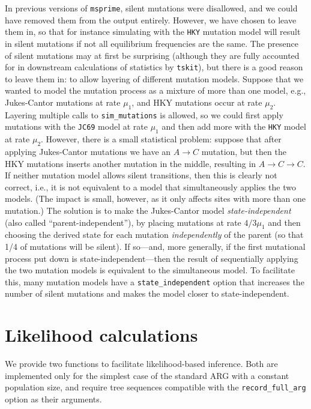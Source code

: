 \documentclass{article}
\newcommand{\msprime}[0]{\texttt{msprime}}
\newcommand{\tskit}[0]{\texttt{tskit}}
\begin{document}
In previous versions of \msprime, silent mutations were disallowed,
and we could have removed them from the output entirely.
However, we have chosen to leave them in, so that for instance
simulating with the \texttt{HKY} mutation model will result in silent mutations
if not all equilibrium frequencies are the same.
The presence of silent mutations may at first be surprising
(although they are fully accounted for in downstream calculations of statistics
by \tskit),
but there is a good reason to leave them in:
to allow layering of different mutation models.
Suppose that we wanted to model the mutation process as a mixture of more than one model,
e.g., Jukes-Cantor mutations at rate $\mu_1$, and
HKY mutations occur at rate $\mu_2$.
Layering multiple calls to \texttt{sim\_mutations} is allowed,
so we could first apply mutations with the \texttt{JC69} model at rate $\mu_1$
and then add more with the \texttt{HKY} model at rate $\mu_2$.
However, there is a small statistical problem:
suppose that after applying Jukes-Cantor mutations we have an $A \to C$ mutation,
but then the HKY mutations inserts another mutation in the middle,
resulting in $A \to C \to C$.
If neither mutation model allows silent transitions,
then this is clearly not correct,
i.e., it is not equivalent to a model that simultaneously applies the two models.
(The impact is small, however, as it only affects sites with more than one mutation.)
The solution is to make the Jukes-Cantor model \emph{state-independent}
(also called ``parent-independent''),
by placing mutations at rate $4/3 \mu_1$ and then choosing the derived state for each mutation
\emph{independently} of the parent (so that 1/4 of mutations will be silent).
If so---and, more generally, if the first mutational process put down is
state-independent---then the result of sequentially applying the two mutation models
is equivalent to the simultaneous model.
To facilitate this, many mutation models have a \texttt{state\_independent} option
that increases the number of silent mutations
and makes the model closer to state-independent.


\section*{Likelihood calculations}
\label{app-likelihoods}

We provide two functions to facilitate likelihood-based inference.
Both are implemented only for the simplest case of the standard ARG with a
constant population size, and require tree sequences compatible with the
\texttt{record\_full\_arg} option as their arguments.
\end{document}
